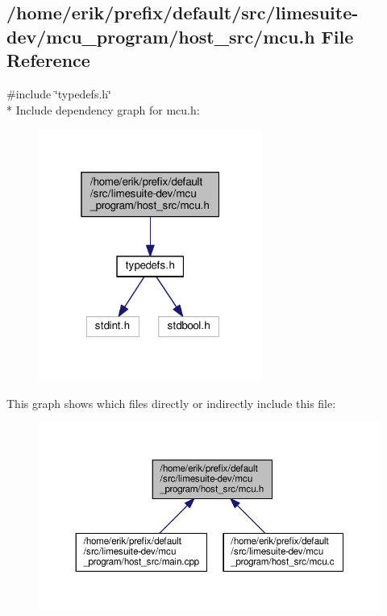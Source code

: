 \subsection{/home/erik/prefix/default/src/limesuite-\/dev/mcu\+\_\+program/host\+\_\+src/mcu.h File Reference}
\label{mcu_8h}
{\ttfamily \#include \char`\"{}typedefs.\+h\char`\"{}}\\*
Include dependency graph for mcu.\+h\+:
\nopagebreak
\begin{figure}[H]
\begin{center}
\leavevmode
\includegraphics[width=208pt]{d5/d4a/mcu_8h__incl}
\end{center}
\end{figure}
This graph shows which files directly or indirectly include this file\+:
\nopagebreak
\begin{figure}[H]
\begin{center}
\leavevmode
\includegraphics[width=350pt]{d4/d88/mcu_8h__dep__incl}
\end{center}
\end{figure}
